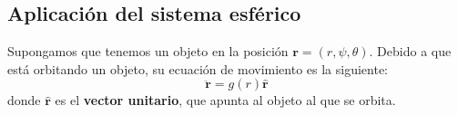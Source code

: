 \documentclass{article}
\begin{document}
\subsection*{Aplicación del sistema esférico}
Supongamos que tenemos un objeto en la posición $\mathbf{r}=(r, \psi, \theta)$. Debido a que está orbitando un objeto, su ecuación de movimiento es la siguiente:
\[
    \ddot{\mathbf{r}}=g(r)\hat{\mathbf{r}}
\]
donde $\hat{\mathbf{r}}$ es el \textbf{vector unitario}, que apunta al objeto al que se orbita.
\end{document}
